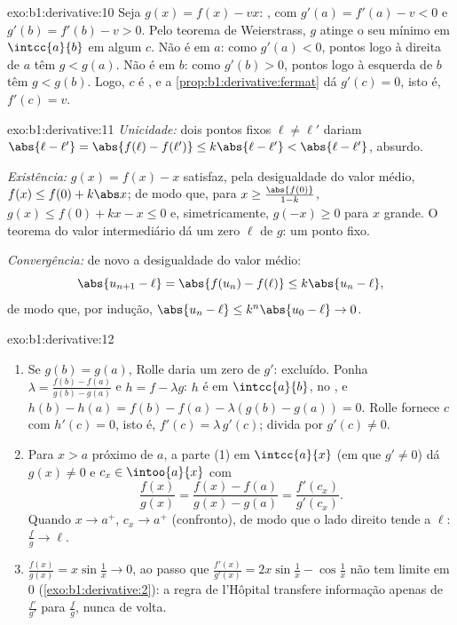 \begin{solution}{exo:b1:derivative:10}
Seja $g(x) = f(x) - vx$: , com $g'(a) = f'(a) - v < 0$
e $g'(b) = f'(b) - v > 0$. Pelo teorema de Weierstrass, $g$
atinge o seu mínimo em $\intcc{a}{b}$ em algum $c$. Não é em $a$:
como $g'(a) < 0$, pontos logo à direita de $a$ têm $g < g(a)$. Não é
em $b$: como $g'(b) > 0$, pontos logo à esquerda de $b$ têm $g <
g(b)$. Logo, $c$ é , e a \cref{prop:b1:derivative:fermat}
dá $g'(c) = 0$, isto é, $f'(c) = v$.
\end{solution}

\begin{solution}{exo:b1:derivative:11}
\emph{Unicidade:} dois pontos fixos $\ell \neq \ell'$ dariam
$\abs{\ell - \ell'} = \abs{f(\ell) - f(\ell')} \leq k\abs{\ell -
\ell'} < \abs{\ell - \ell'}$, absurdo.

\emph{Existência:} $g(x) = f(x) - x$ satisfaz, pela desigualdade do valor
médio, $f(x) \leq f(0) + k\abs x$; de modo que, para $x \geq
\frac{\abs{f(0)}}{1 - k}$, $g(x) \leq f(0) + kx - x \leq 0$ e,
simetricamente, $g(-x) \geq 0$ para $x$ grande. O teorema do valor
intermediário dá um zero $\ell$ de $g$: um ponto fixo.

\emph{Convergência:} de novo a desigualdade do valor médio:
\[
\abs{u_{n+1} - \ell} = \abs{f(u_n) - f(\ell)} \leq k\abs{u_n - \ell},
\]
de modo que, por indução, $\abs{u_n - \ell} \leq k^n \abs{u_0 - \ell} \to 0$.
\end{solution}

\begin{solution}{exo:b1:derivative:12}
\begin{enumerate}
  \item Se $g(b) = g(a)$, Rolle daria um zero  de
        $g'$: excluído. Ponha $\lambda = \frac{f(b) - f(a)}{g(b) -
        g(a)}$ e $h = f - \lambda g$: $h$ é  em
        $\intcc{a}{b}$,  no , e $h(b) - h(a)
        = f(b) - f(a) - \lambda(g(b) - g(a)) = 0$. Rolle
        fornece $c$ com $h'(c) = 0$, isto é, $f'(c) =
        \lambda\,g'(c)$; divida por $g'(c) \neq 0$.
  \item Para $x > a$ próximo de $a$, a parte (1) em $\intcc{a}{x}$
        (em que $g' \neq 0$) dá $g(x) \neq 0$ e $c_x \in
        \intoo{a}{x}$ com
        \[
        \frac{f(x)}{g(x)} = \frac{f(x) - f(a)}{g(x) - g(a)}
        = \frac{f'(c_x)}{g'(c_x)} .
        \]
        Quando $x \to a^+$, $c_x \to a^+$ (confronto), de modo que o lado
        direito tende a $\ell$: $\frac{f}{g} \to \ell$.
  \item $\frac{f(x)}{g(x)} = x\sin\frac1x \to 0$, ao passo que
        $\frac{f'(x)}{g'(x)} = 2x\sin\frac1x - \cos\frac1x$ não
        tem limite em $0$ (\cref{exo:b1:derivative:2}):
        a regra de l'Hôpital transfere informação apenas de
        $\frac{f'}{g'}$ para $\frac fg$, nunca de volta.
\end{enumerate}
\end{solution}

